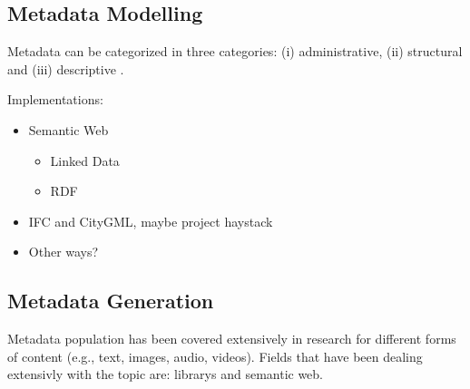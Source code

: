 \subsection{Metadata Modelling} %
\label{sub:metadata_modelling}

Metadata can be categorized in three categories: (i) administrative, (ii) structural and (iii) descriptive \cite{taylor2004organization}.

Implementations:

\begin{itemize}

  \item Semantic Web

  \begin{itemize}

    \item Linked Data
    \item RDF

  \end{itemize}
  
  \item IFC and CityGML, maybe project haystack
  
  \item Other ways?

\end{itemize}



\subsection{Metadata Generation} %
\label{sub:metadata_generation}
Metadata population has been covered extensively in research for different forms of content (e.g., text, images, audio, videos).
Fields that have been dealing extensivly with the topic are: librarys and semantic web.

